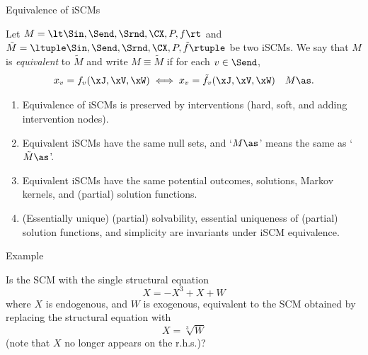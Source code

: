 \begin{frame}{Equivalence of iSCMs}
  \begin{Def}[\ref{def:equivalent_scms}]
  Let $M = \lt \Sin, \Send, \Srnd, \CX, P, f \rt$ and
  $\tilde{M} = \ltuple \Sin, \Send, \Srnd, \CX, P, \tilde{f} \rtuple$ be two iSCMs.
  We say that
  $M$ is \emph{equivalent} to $\tilde{M}$ and write $M \equiv \tilde{M}$ if for each $v \in \Send$,
  $$x_v = f_v(\xJ,\xV,\xW) \iff x_v = \tilde{f}_v(\xJ,\xV,\xW)\quad M\as.$$
\end{Def}
\begin{Prp}[\ref{prp:equivalent_scms}]
\begin{enumerate}
  \item Equivalence of iSCMs is preserved by interventions (hard, soft, and adding intervention nodes).
  \item Equivalent iSCMs have the same null sets, and `$M\as$' means the same as `$\tilde{M}\as$'.
  \item Equivalent iSCMs have the same potential outcomes, solutions, Markov kernels, and (partial) solution functions.
  \item (Essentially unique) (partial) solvability, essential uniqueness of (partial) solution functions, and simplicity are invariants under iSCM equivalence.
\end{enumerate}
\end{Prp}
\end{frame}

\begin{frame}{Example}
\begin{Eg}
  Is the SCM with the single structural equation
  $$X = -X^3 + X + W$$
  where $X$ is endogenous, and $W$ is exogenous, equivalent to the SCM obtained by replacing the structural equation with
  $$X = \sqrt[3]{W}$$
  (note that $X$ no longer appears on the r.h.s.)?

  \bigskip
\end{Eg}
\end{frame}

